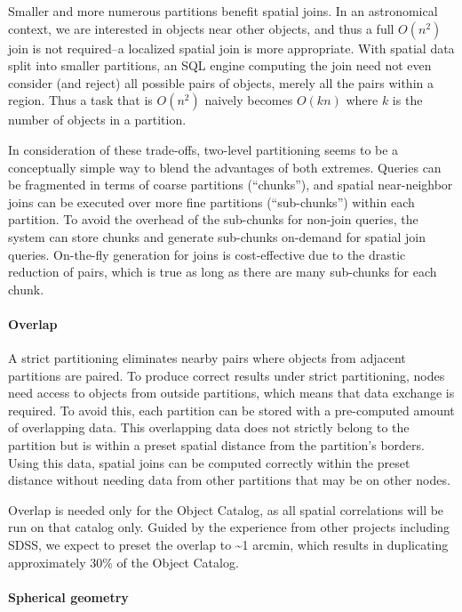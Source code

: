 \documentclass[DM,lsstdraft,toc]{lsstdoc}
\begin{document}
Smaller and more numerous partitions benefit spatial joins. In an
astronomical context, we are interested in objects near other objects,
and thus a full \(O(n^2)\) join is not required--a localized spatial
join is more appropriate. With spatial data split into smaller
partitions, an SQL engine computing the join need not even consider (and
reject) all possible pairs of objects, merely all the pairs within a
region. Thus a task that is \(O(n^2)\) naively becomes \(O(kn)\) where
\(k\) is the number of objects in a partition.

In consideration of these trade-offs, two-level partitioning seems to be
a conceptually simple way to blend the advantages of both extremes.
Queries can be fragmented in terms of coarse partitions (``chunks''),
and spatial near-neighbor joins can be executed over more fine
partitions (``sub-chunks'') within each partition. To avoid the overhead
of the sub-chunks for non-join queries, the system can store chunks and
generate sub-chunks on-demand for spatial join queries. On-the-fly
generation for joins is cost-effective due to the drastic reduction of
pairs, which is true as long as there are many sub-chunks for each
chunk.

\paragraph{Overlap}\label{overlap}

A strict partitioning eliminates nearby pairs where objects from
adjacent partitions are paired. To produce correct results under strict
partitioning, nodes need access to objects from outside partitions,
which means that data exchange is required. To avoid this, each
partition can be stored with a pre-computed amount of overlapping data.
This overlapping data does not strictly belong to the partition but is
within a preset spatial distance from the partition's borders. Using
this data, spatial joins can be computed correctly within the preset
distance without needing data from other partitions that may be on other
nodes.

Overlap is needed only for the Object Catalog, as all spatial
correlations will be run on that catalog only. Guided by the experience
from other projects including SDSS, we expect to preset the overlap to
\textasciitilde{}1 arcmin, which results in duplicating approximately
30\% of the Object Catalog.

\paragraph{Spherical geometry}\label{spherical-geometry}
\end{document}
